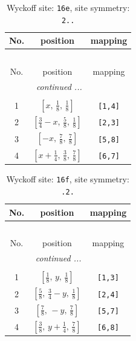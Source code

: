\documentclass[fleqn,8pt]{jsarticle}
\begin{document}
\renewcommand{\arraystretch}{1.2}
\begin{longtable}{ccc}
\caption{Wyckoff site: {\tt 16e}, site symmetry: {\tt 2..}}
 \\
 \hline \hline
No. & position & mapping \\ \hline \endfirsthead

\multicolumn{2}{l}{\tablename\ \thetable{}} \\
 \hline \hline
No. & position & mapping \\ \hline \endhead

 \hline \hline
\multicolumn{2}{r}{\footnotesize\it continued ...} \\ \endfoot

 \hline \hline
\multicolumn{2}{r}{} \\ \endlastfoot

1 & $\left[ x,\, \frac{1}{8},\, \frac{1}{8} \right]$ & {\tt [1,4]} \\ \hline
2 & $\left[ \frac{3}{4} - x,\, \frac{5}{8},\, \frac{1}{8} \right]$ & {\tt [2,3]} \\ \hline
3 & $\left[ - x,\, \frac{7}{8},\, \frac{7}{8} \right]$ & {\tt [5,8]} \\ \hline
4 & $\left[ x + \frac{1}{4},\, \frac{3}{8},\, \frac{7}{8} \right]$ & {\tt [6,7]} \\
\end{longtable}
\renewcommand{\arraystretch}{1.2}
\begin{longtable}{ccc}
\caption{Wyckoff site: {\tt 16f}, site symmetry: {\tt .2.}}
 \\
 \hline \hline
No. & position & mapping \\ \hline \endfirsthead

\multicolumn{2}{l}{\tablename\ \thetable{}} \\
 \hline \hline
No. & position & mapping \\ \hline \endhead

 \hline \hline
\multicolumn{2}{r}{\footnotesize\it continued ...} \\ \endfoot

 \hline \hline
\multicolumn{2}{r}{} \\ \endlastfoot

1 & $\left[ \frac{1}{8},\, y,\, \frac{1}{8} \right]$ & {\tt [1,3]} \\ \hline
2 & $\left[ \frac{5}{8},\, \frac{3}{4} - y,\, \frac{1}{8} \right]$ & {\tt [2,4]} \\ \hline
3 & $\left[ \frac{7}{8},\, - y,\, \frac{7}{8} \right]$ & {\tt [5,7]} \\ \hline
4 & $\left[ \frac{3}{8},\, y + \frac{1}{4},\, \frac{7}{8} \right]$ & {\tt [6,8]} \\
\end{longtable}
\end{document}
